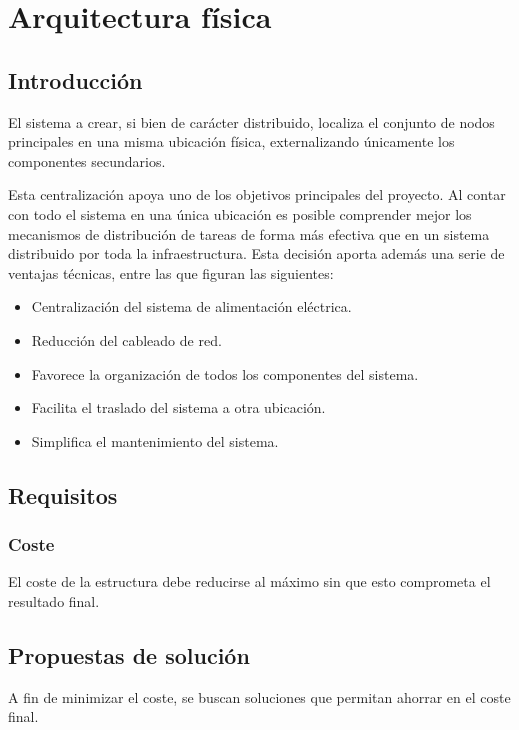 \chapter{Arquitectura física}

\section{Introducción}

El sistema a crear, si bien de carácter distribuido, localiza el conjunto de nodos principales en una misma ubicación física, externalizando únicamente los componentes secundarios.

Esta centralización apoya uno de los objetivos principales del proyecto. Al contar con todo el sistema en una única ubicación es posible comprender mejor los mecanismos de distribución de tareas de forma más efectiva que en un sistema distribuido por toda la infraestructura. Esta decisión aporta además una serie de ventajas técnicas, entre las que figuran las siguientes:

\begin{itemize}
\item Centralización del sistema de alimentación eléctrica.
\item Reducción del cableado de red.
\item Favorece la organización de todos los componentes del sistema.
\item Facilita el traslado del sistema a otra ubicación.
\item Simplifica el mantenimiento del sistema.
\end{itemize}

\section{Requisitos}

\subsection{Coste}

El coste de la estructura debe reducirse al máximo sin que esto comprometa el resultado final.

\section{Propuestas de solución}

A fin de minimizar el coste, se buscan soluciones que permitan ahorrar en el coste final.

